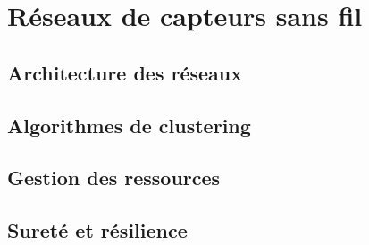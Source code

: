 \section{Réseaux de capteurs sans fil}

\subsection{Architecture des réseaux}

\subsection{Algorithmes de clustering}

\subsection{Gestion des ressources}

\subsection{Sureté et résilience}
